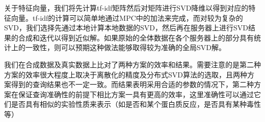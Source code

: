 关于特征向量，我们将先计算tf-idf矩阵然后对矩阵进行SVD降维以得到对应的特征向量。tf-idf的计算可以简单地通过MPC中的加法来完成，而对较为复杂的SVD，我们选择先通过本地计算本地数据的SVD，然后再在服务器上进行SVD结果的合成和迭代以得到近似解。如果原始的全体数据在各个服务器上的部分具有统计上的一致性，则可以预期这种做法能够取得较为准确的全局SVD解。

我们在合成数据及真实数据上比对了两种方案的效率和结果。需要注意的是第二种方案的效率很大程度上取决于离散化的精度及分布式SVD算法的选取，且两种方案得到的查询结果也不一定一致。而结果表明采用合适的参数的情况下，第二种方案在保证查询准确性的前提下相比方案一具有更高的效率，这里准确性可以通过它们是否具有相似的实验性质来表示（如是否和某个蛋白质反应，是否具有某种毒性等）